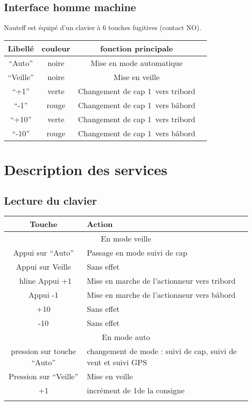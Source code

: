 \documentclass[a4paper,11pt]{report}
\begin{document}
\section{Interface homme machine}
Nauteff est équipé d'un clavier à 6 touches fugitives (contact NO).
\\
\begin{tabular}{|c|c|c|c|}
	\hline 
	Libellé    & couleur & fonction principale &  \\ 
	\hline 
	``Auto''   & noire & Mise en mode automatique &  \\ 
	\hline 
	``Veille'' & noire & Mise en veille &  \\ 
	\hline 
	``+1''     & verte & Changement de cap 1\degres~vers tribord &  \\ 
	\hline 
	``-1''     & rouge & Changement de cap 1\degres~vers bâbord  &  \\ 
	\hline 
	``+10''    & verte & Changement de cap 1\degres~vers tribord &  \\ 
	\hline 
	``-10''    & rouge & Changement de cap 1\degres~vers bâbord  &  \\ 
	\hline 
\end{tabular} 



\chapter{Description des services}

\section{Lecture du clavier}

\begin{tabular}{|c|p{6cm} |}
	\hline
	 Touche & Action  \\ \hline
	\multicolumn{2}{|c|}{En mode veille} \\ \hline
	 Appui sur ``Auto'' & Passage en mode suivi de cap\\ \hline
	 Appui sur Veille & Sans effet \\ \ hline
	 Appui +1 &  Mise en marche de l'actionneur vers tribord \\ \hline
	 Appui -1 &  Mise en marche de l'actionneur vers bâbord \\ \hline
	 +10 & Sans effet     \\ \hline
	 -10 &  Sans effet    \\ \hline
	\multicolumn{2}{|c|}{En mode auto} \\ \hline
	pression sur touche ``Auto'' & changement de mode : suivi de cap, suivi de vent et suivi GPS     \\ \hline
	Pression sur ``Veille'' & Mise en veille     \\ \hline
	+1 & incrément de 1\degres de la consigne      \\ \hline
	 &      \\ \hline
	 
\end{tabular} 
\end{document}
